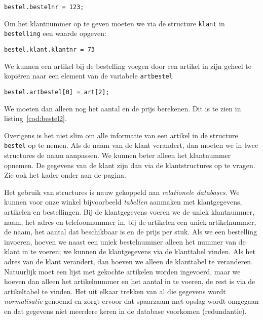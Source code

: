 \hspace*{1em}\texttt{bestel.bestelnr = 123;}

Om het klantnummer op te geven moeten we via de structure \texttt{klant} in \texttt{bestelling} een waarde opgeven:

\hspace*{1em}\texttt{bestel.klant.klantnr = 73}

We kunnen een artikel bij de bestelling voegen door een artikel in zijn geheel te kopiëren naar een element van de variabele \texttt{artbestel}

\hspace*{1em}\texttt{bestel.artbestel[0] = art[2];}

We moeten dan alleen nog het aantal en de prijs berekenen. Dit is te zien in listing~\ref{cod:bestel2}.


Overigens is het niet slim om alle informatie van een artikel in de structure \texttt{bestel} op te nemen. Als de naam van de klant verandert, dan moeten we in twee structures de naam aanpassen. We kunnen beter alleen het klantnummer opnemen. De gegevens van de klant zijn dan via de klantstructures op te vragen. Zie ook het kader onder aan de pagina.

\begin{infobox}
Het gebruik van structures is nauw gekoppeld aan \textsl{relationele databases}. We kunnen voor onze winkel bijvoorbeeld \textsl{tabellen} aanmaken met klantgegevens, artikelen en bestellingen. Bij de klantgegevens voeren we de uniek klantnummer, naam, het adres en telefoonnummer in, bij de artikelen een uniek artikelnummer, de naam, het aantal dat beschikbaar is en de prijs per stuk. Als we een bestelling invoeren, hoeven we naast een uniek bestelnummer alleen het nummer van de klant in te voeren; we kunnen de klantgegevens via de klanttabel vinden. Als het adres van de klant verandert, dan hoeven we alleen de klanttabel te veranderen. Natuurlijk moet een lijst met gekochte artikelen worden ingevoerd, maar we hoeven dan alleen het artikelnummer en het aantal in te voeren, de rest is via de artikeltabel te vinden. Het uit elkaar trekken van al die gegevens wordt \textsl{normalisatie} genoemd en zorgt ervoor dat spaarzaam met opslag wordt omgegaan en dat gegevens niet meerdere keren in de database voorkomen (redundantie).
\end{infobox}


